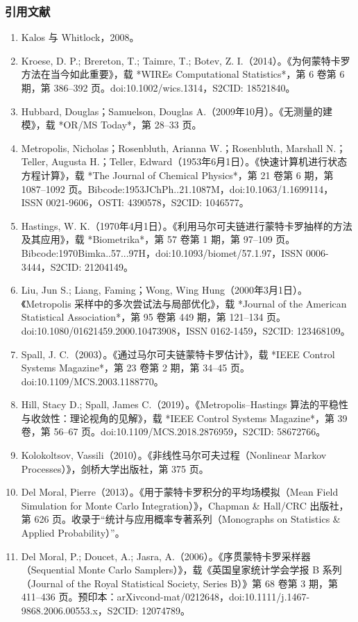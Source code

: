 \subsubsection{引用文献}
\begin{enumerate}
\item Kalos 与 Whitlock，2008。
\item Kroese, D. P.; Brereton, T.; Taimre, T.; Botev, Z. I.（2014）。《为何蒙特卡罗方法在当今如此重要》，载 *WIREs Computational Statistics*，第 6 卷第 6 期，第 386–392 页。doi:10.1002/wics.1314，S2CID: 18521840。
\item Hubbard, Douglas；Samuelson, Douglas A.（2009年10月）。《无测量的建模》，载 *OR/MS Today*，第 28–33 页。
\item Metropolis, Nicholas；Rosenbluth, Arianna W.；Rosenbluth, Marshall N.；Teller, Augusta H.；Teller, Edward（1953年6月1日）。《快速计算机进行状态方程计算》，载 *The Journal of Chemical Physics*，第 21 卷第 6 期，第 1087–1092 页。Bibcode:1953JChPh..21.1087M，doi:10.1063/1.1699114，ISSN 0021-9606，OSTI: 4390578，S2CID: 1046577。
\item Hastings, W. K.（1970年4月1日）。《利用马尔可夫链进行蒙特卡罗抽样的方法及其应用》，载 *Biometrika*，第 57 卷第 1 期，第 97–109 页。Bibcode:1970Bimka..57...97H，doi:10.1093/biomet/57.1.97，ISSN 0006-3444，S2CID: 21204149。
\item Liu, Jun S.; Liang, Faming；Wong, Wing Hung（2000年3月1日）。《Metropolis 采样中的多次尝试法与局部优化》，载 *Journal of the American Statistical Association*，第 95 卷第 449 期，第 121–134 页。doi:10.1080/01621459.2000.10473908，ISSN 0162-1459，S2CID: 123468109。
\item Spall, J. C.（2003）。《通过马尔可夫链蒙特卡罗估计》，载 *IEEE Control Systems Magazine*，第 23 卷第 2 期，第 34–45 页。doi:10.1109/MCS.2003.1188770。
\item Hill, Stacy D.; Spall, James C.（2019）。《Metropolis–Hastings 算法的平稳性与收敛性：理论视角的见解》，载 *IEEE Control Systems Magazine*，第 39 卷，第 56–67 页。doi:10.1109/MCS.2018.2876959，S2CID: 58672766。
\item Kolokoltsov, Vassili（2010）。《非线性马尔可夫过程（Nonlinear Markov Processes）》，剑桥大学出版社，第 375 页。
\item Del Moral, Pierre（2013）。《用于蒙特卡罗积分的平均场模拟（Mean Field Simulation for Monte Carlo Integration）》，Chapman & Hall/CRC 出版社，第 626 页。收录于“统计与应用概率专著系列（Monographs on Statistics & Applied Probability）”。
\item Del Moral, P.; Doucet, A.; Jasra, A.（2006）。《序贯蒙特卡罗采样器（Sequential Monte Carlo Samplers）》，载《英国皇家统计学会学报 B 系列（Journal of the Royal Statistical Society, Series B）》第 68 卷第 3 期，第 411–436 页。预印本：arXiv\:cond-mat/0212648，doi:10.1111/j.1467-9868.2006.00553.x，S2CID: 12074789。

\end{enumerate}
